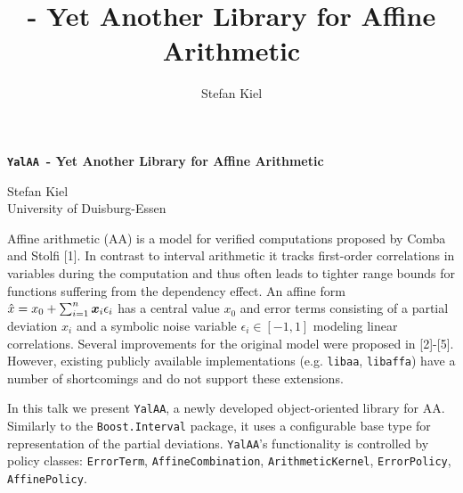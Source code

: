 \documentclass[a4, fontsize=10pt]{scrartcl}
\title{\yalaa - Yet Another Library for Affine Arithmetic}
\author{Stefan Kiel}
\newcommand{\iv}[2]{\ensuremath{[#1, #2]}\xspace}
\newcommand{\aff}[1]{\ensuremath{\hat{#1}}\xspace}
\newcommand{\yalaa}{\texttt{YalAA}\xspace}
\begin{document}
\begin{center}
{\Large\bf
\yalaa\ - Yet Another Library for Affine Arithmetic
}

\bigskip

{\large
Stefan Kiel\\
}
\medskip
University of Duisburg-Essen


\end{center}
\medskip

Affine arithmetic (AA) is a model for verified computations proposed by Comba
and Stolfi [1]. In contrast to interval arithmetic it tracks first-order
correlations in variables during the computation and thus often leads to
tighter range bounds for functions suffering from the dependency effect. An
affine form $\aff x = x_0 + \sum_{i=1}^n \x_i\epsilon_i$ has a central value
$x_0$ and error terms consisting of a partial deviation $x_i$ and a symbolic
noise variable $\epsilon_i \in \iv{-1}{1}$ modeling linear correlations.
Several improvements for the original model were proposed in [2]-[5]. However,
existing publicly available implementations (e.g. \texttt{libaa},
\texttt{libaffa}) have a number of shortcomings and do not support these
extensions.


In this talk we present \yalaa, a newly developed object-oriented library for
AA. Similarly to the \texttt{Boost.Interval} package, it uses  a configurable
base type for representation of the partial deviations. \yalaa's functionality is
controlled by policy classes: \texttt{ErrorTerm}, \texttt{AffineCombination},
\texttt{ArithmeticKernel}, \texttt{ErrorPolicy}, \texttt{AffinePolicy}.
\end{document}
